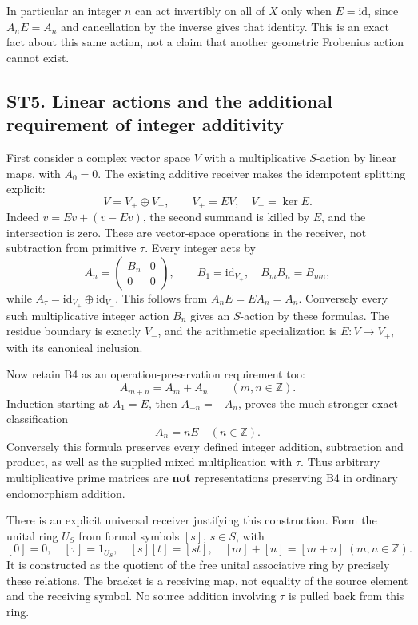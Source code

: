 In particular an integer \(n\) can act invertibly on all of \(X\) only
when \(E=\mathrm{id}\), since \(A_nE=A_n\) and cancellation by the
inverse gives that identity. This is an exact fact about this same
action, not a claim that another geometric Frobenius action cannot
exist.

\subsection{ST5. Linear actions and the additional requirement of
integer
additivity}\label{st5.-linear-actions-and-the-additional-requirement-of-integer-additivity}

First consider a complex vector space \(V\) with a multiplicative
\(S\)-action by linear maps, with \(A_0=0\). The existing additive
receiver makes the idempotent splitting explicit: \[
 V=V_+\oplus V_-,\qquad
 V_+=EV,\quad V_-=\ker E.
\tag{ST5.1}
\] Indeed \(v=Ev+(v-Ev)\), the second summand is killed by \(E\), and
the intersection is zero. These are vector-space operations in the
receiver, not subtraction from primitive \(\tau\). Every integer acts by
\[
 A_n=\begin{pmatrix}B_n&0\\0&0\end{pmatrix},\qquad
 B_1=\mathrm{id}_{V_+},\quad B_mB_n=B_{mn},
\tag{ST5.2}
\] while \(A_\tau=\mathrm{id}_{V_+}\oplus\mathrm{id}_{V_-}\). This
follows from \(A_nE=EA_n=A_n\). Conversely every such multiplicative
integer action \(B_n\) gives an \(S\)-action by these formulas. The
residue boundary is exactly \(V_-\), and the arithmetic specialization
is \(E:V\to V_+\), with its canonical inclusion.

Now retain B4 as an operation-preservation requirement too: \[
 A_{m+n}=A_m+A_n\qquad(m,n\in\mathbb Z).
\tag{ST5.3}
\] Induction starting at \(A_1=E\), then \(A_{-n}=-A_n\), proves the
much stronger exact classification \[
 \boxed{A_n=nE\quad(n\in\mathbb Z).}
\tag{ST5.4}
\] Conversely this formula preserves every defined integer addition,
subtraction and product, as well as the supplied mixed multiplication
with \(\tau\). Thus arbitrary multiplicative prime matrices are
\textbf{not} representations preserving B4 in ordinary endomorphism
addition.

There is an explicit universal receiver justifying this construction.
Form the unital ring \(U_S\) from formal symbols \([s]\), \(s\in S\),
with \[
 [0]=0,\quad[\tau]=1_{U_S},\quad[s][t]=[st],\quad
 [m]+[n]=[m+n]\ (m,n\in\mathbb Z).
\tag{ST5.5}
\] It is constructed as the quotient of the free unital associative ring
by precisely these relations. The bracket is a receiving map, not
equality of the source element and the receiving symbol. No source
addition involving \(\tau\) is pulled back from this ring.

